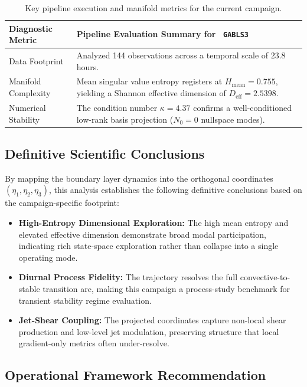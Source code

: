 \documentclass[11pt,a4paper]{article}
\begin{document}
\begin{table}[htbp]
    \centering
    \small
    \begin{tabular}{l p{9cm}}
        \hline
                \textbf{Diagnostic Metric} & \textbf{Pipeline Evaluation Summary for \texttt{ GABLS3 }} \\ \hline
        Data Footprint & Analyzed 144 observations across a temporal scale of 23.8 hours. \\
        Manifold Complexity & Mean singular value entropy registers at $H_{\text{mean}} = 0.755$, yielding a Shannon effective dimension of $D_{\text{eff}} = 2.5398$. \\
        Numerical Stability & The condition number $\kappa = 4.37$ confirms a well-conditioned low-rank basis projection ($N_0 = 0$ nullspace modes). \\ \hline
    \end{tabular}
    \caption{Key pipeline execution and manifold metrics for the current campaign.}
    \label{tab:pipeline_summary_GABLS3}
\end{table}

\subsection{Definitive Scientific Conclusions}

By mapping the boundary layer dynamics into the orthogonal coordinates $(\eta_1, \eta_2, \eta_3)$, this analysis establishes the following definitive conclusions based on the campaign-specific footprint:

\begin{itemize}
    \item \textbf{ High-Entropy Dimensional Exploration: } The high mean entropy and elevated effective dimension demonstrate broad modal participation, indicating rich state-space exploration rather than collapse into a single operating mode.
    \item \textbf{ Diurnal Process Fidelity: } The trajectory resolves the full convective-to-stable transition arc, making this campaign a process-study benchmark for transient stability regime evaluation.
    \item \textbf{ Jet-Shear Coupling: } The projected coordinates capture non-local shear production and low-level jet modulation, preserving structure that local gradient-only metrics often under-resolve.
\end{itemize}

\subsection{Operational Framework Recommendation}
\end{document}
